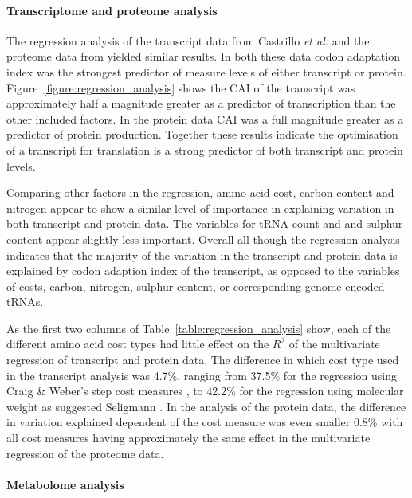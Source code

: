 \paragraph{Transcriptome and proteome analysis}

The regression analysis of the transcript data from Castrillo \emph{et al.} \cite{castrillo2007} and the proteome data from \cite{ghaemmaghami2003} yielded similar results. In both these data codon adaptation index was the strongest predictor of measure levels of either transcript or protein. Figure~\ref{figure:regression_analysis} shows the CAI of the transcript was approximately half a magnitude greater as a predictor of transcription than the other included factors. In the protein data CAI was a full magnitude greater as a predictor of protein production. Together these results indicate the optimisation of a transcript for translation is a strong predictor of both transcript and protein levels.

Comparing other factors in the regression, amino acid cost, carbon content and nitrogen appear to show a similar level of importance in explaining variation in both transcript and protein data. The variables for tRNA count and and sulphur content appear slightly less important. Overall all though the regression analysis indicates that the majority of the variation in the transcript and protein data is explained by codon adaption index of the transcript, as opposed to the variables of costs, carbon, nitrogen, sulphur content, or corresponding genome encoded tRNAs.

As the first two columns of Table~\vref{table:regression_analysis} show, each of the different amino acid cost types had little effect on the $R^2$ of the multivariate regression of transcript and protein data. The difference in which cost type used in the transcript analysis was 4.7\%, ranging from 37.5\% for the regression using Craig \& Weber's step cost measures \cite{craig1998}, to 42.2\% for the regression using molecular weight as suggested Seligmann \cite{seligmann2004}. In the analysis of the protein data, the difference in variation explained dependent of the cost measure was even smaller 0.8\% with all cost measures having approximately the same effect in the multivariate regression of the proteome data.

\paragraph{Metabolome analysis}


